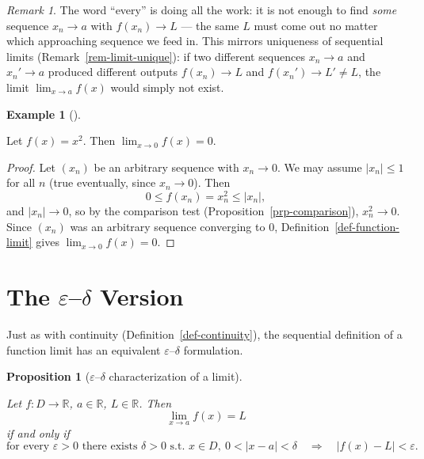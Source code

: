 \documentclass[
  letterpaper,
  DIV=11,
  numbers=noendperiod]{scrreprt}
\theoremstyle{plain}
\theoremstyle{plain}
\newtheorem{proposition}{Proposition}[chapter]
\theoremstyle{definition}
\theoremstyle{definition}
\theoremstyle{definition}
\newtheorem{example}{Example}[chapter]
\theoremstyle{plain}
\theoremstyle{plain}
\theoremstyle{remark}
\newtheorem{refremark}{Remark}[chapter]
\begin{document}
\begin{refremark}
The word ``every'' is doing all the work: it is not enough to find
\emph{some} sequence \(x_n\to a\) with \(f(x_n)\to L\) --- the same
\(L\) must come out no matter which approaching sequence we feed in.
This mirrors uniqueness of sequential limits
(Remark~\ref{rem-limit-unique}): if two different sequences \(x_n\to a\)
and \(x_n'\to a\) produced different outputs \(f(x_n)\to L\) and
\(f(x_n')\to L'\neq L\), the limit \(\lim_{x\to a}f(x)\) would simply
not exist.

\label{rem-function-limit-every-sequence}

\end{refremark}

\begin{example}[]\protect\hypertarget{exm-x-squared-function-limit}{}\label{exm-x-squared-function-limit}

\hfill\break
Let \(f(x) = x^2\). Then \(\displaystyle\lim_{x\to 0} f(x) = 0\).

\begin{proof}
Let \((x_n)\) be an arbitrary sequence with \(x_n\to 0\). We may assume
\(\lvert x_n \rvert\le 1\) for all \(n\) (true eventually, since
\(x_n\to0\)). Then \[
0 \le f(x_n) = x_n^2 \le \lvert x_n \rvert,
\] and \(\lvert x_n \rvert\to 0\), so by the comparison test
(Proposition~\ref{prp-comparison}), \(x_n^2 \to 0\). Since \((x_n)\) was
an arbitrary sequence converging to \(0\),
Definition~\ref{def-function-limit} gives \(\lim_{x\to0} f(x) = 0\).
\end{proof}

\end{example}

\section{\texorpdfstring{The \(\varepsilon\)--\(\delta\)
Version}{The \textbackslash varepsilon--\textbackslash delta Version}}\label{the-varepsilondelta-version}

Just as with continuity (Definition~\ref{def-continuity}), the
sequential definition of a function limit has an equivalent
\(\varepsilon\)--\(\delta\) formulation.

\begin{proposition}[\(\varepsilon\)--\(\delta\) characterization of a
limit]\protect\hypertarget{prp-function-limit-eps-delta}{}\label{prp-function-limit-eps-delta}

Let \(f\colon D\to\mathbb{R}\), \(a\in\mathbb{R}\), \(L\in\mathbb{R}\).
Then \[
\lim_{x\to a} f(x) = L
\] if and only if \[
\text{for every } \varepsilon>0 \text{ there exists } \delta>0 \text{ s.t. }
x\in D,\ 0<\lvert x-a \rvert<\delta \quad \Rightarrow \quad\lvert f(x)-L \rvert<\varepsilon.
\]

\end{proposition}
\end{document}

